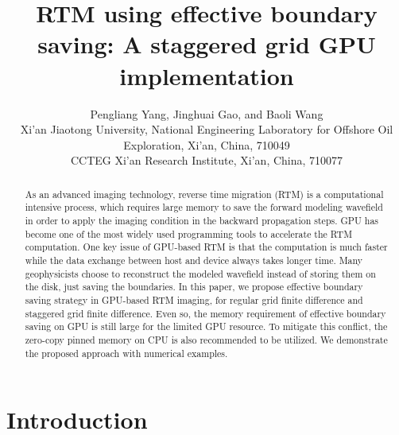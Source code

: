 
\title{RTM using effective boundary saving: A staggered grid GPU implementation}

\renewcommand{\thefootnote}{\fnsymbol{footnote}}


\author{Pengliang Yang\footnotemark[1], Jinghuai Gao\footnotemark[1], and Baoli Wang\footnotemark[2] \\
\footnotemark[1]Xi'an Jiaotong University, National Engineering Laboratory for Offshore Oil Exploration, Xi'an, China, 710049\\
\footnotemark[2]CCTEG  Xi’an Research Institute, Xi’an, China, 710077
}




\maketitle

\begin{abstract}
 As an advanced imaging technology, reverse time migration (RTM) is a computational intensive process, which requires large memory to save the forward modeling wavefield in order to apply the imaging condition in the backward propagation steps. GPU has become one of the most widely used programming tools to accelerate the RTM computation. One key issue of GPU-based RTM is that the computation is much faster while the data exchange between host and device always takes longer time.  Many geophysicists choose to reconstruct the modeled wavefield instead of storing them on the disk, just saving the boundaries. In this paper, we propose effective boundary saving strategy in GPU-based RTM imaging, for regular grid finite difference and staggered grid finite difference. Even so, the memory requirement of effective boundary saving on GPU is still large for the limited GPU resource. To mitigate this conflict, the zero-copy pinned memory on CPU is also recommended to be utilized. We demonstrate the proposed approach with numerical examples.
\end{abstract}


\section{Introduction}


